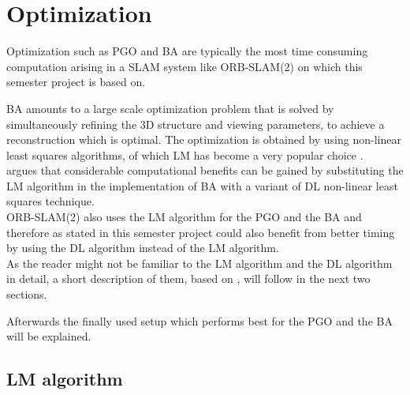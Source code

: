 \chapter{Optimization}
\label{sec:optimization}

Optimization such as \acf{PGO} and \acf{BA} are typically the most time consuming computation arising in a \acf{SLAM} system like ORB-SLAM(2) \cite{Mur-Artal2015,Mur-Artal2016} on which this semester project is based on.

\ac{BA} amounts to a large scale optimization problem that is solved by simultaneously refining the 3D structure and viewing parameters, to achieve a reconstruction which is optimal. The optimization is obtained by using non-linear least squares algorithms, of which \acf{LM} has become a very popular choice \cite{Lourakis2005}.\\

\cite{Lourakis2005} argues that considerable computational benefits can be gained by substituting the \ac{LM} algorithm in the implementation of \ac{BA} with a variant of \ac{DL} non-linear least squares technique.\\

ORB-SLAM(2) also uses the \ac{LM} algorithm for the \ac{PGO} and the \ac{BA} and therefore as stated in \cite{Lourakis2005} this semester project could also benefit from better timing by using the \ac{DL} algorithm instead of the \ac{LM} algorithm.\\

As the reader might not be familiar to the \ac{LM} algorithm and the \ac{DL} algorithm in detail, a short description of them, based on \cite{Lourakis2005}, will follow in the next two sections.

Afterwards the finally used setup which performs best for the \ac{PGO} and the \ac{BA} will be explained.

\section{\acf{LM} algorithm} 

